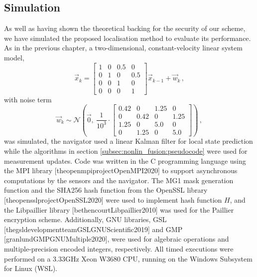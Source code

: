 \subsection{Simulation}\label{subsec:nonlin_fusion:simulation}
As well as having shown the theoretical backing for the security of our scheme, we have simulated the proposed localisation method to evaluate its performance. As in the previous chapter, a two-dimensional, constant-velocity linear system model,
\begin{equation}\label{eq:nonlin_fusion:simulation_system_model}
    \vec{x}_{k} = 
    \begin{bmatrix}
        1 & 0 & 0.5 & 0\\
        0 & 1 & 0   & 0.5\\
        0 & 0 & 1   & 0\\
        0 & 0 & 0   & 1
    \end{bmatrix}\vec{x}_{k-1} + \vec{w}_k\,,
\end{equation}
with noise term
\begin{equation}
    \vec{w}_k\sim\mathcal{N}\left(\vec{0},\ \frac{1}{10^{3}}\cdot
    \begin{bmatrix}
        0.42 & 0    & 1.25 & 0\\
        0    & 0.42 & 0    & 1.25\\
        1.25 & 0    & 5.0  & 0\\
        0    & 1.25 & 0    & 5.0
    \end{bmatrix}
    \right)\,,
\end{equation}
was simulated, the navigator used a linear Kalman filter for local state prediction while the algorithms in section \ref{subsec:nonlin_fusion:pseudocode} were used for measurement updates. Code was written in the C programming language using the MPI library [theopenmpiprojectOpenMPI2020] to support asynchronous computations by the sensors and the navigator. The MG1 mask generation function and the SHA256 hash function from the OpenSSL library [theopensslprojectOpenSSL2020] were used to implement hash function $H$, and the Libpaillier library [bethencourtLibpaillier2010] was used for the Paillier encryption scheme. Additionally, GNU libraries, GSL [thegsldevelopmentteamGSLGNUScientific2019] and GMP [granlundGMPGNUMultiple2020], were used for algebraic operations and multiple-precision encoded integers, respectively. All timed executions were performed on a 3.33GHz Xeon W3680 CPU, running on the Windows Subsystem for Linux (WSL).


